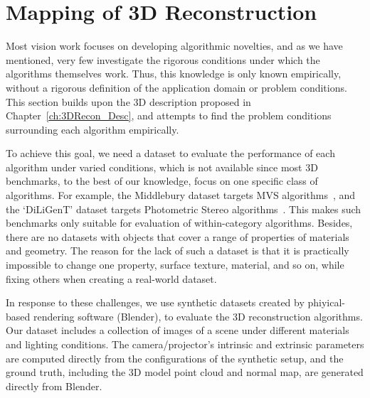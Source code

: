 
\chapter{Mapping of 3D Reconstruction}
\label{ch:3DRecon_Mapping}
Most vision work focuses on developing algorithmic novelties, and as we have mentioned, very few investigate the rigorous conditions under which the algorithms themselves work. Thus, this knowledge is only known empirically, without a rigorous definition of the application domain or problem conditions. This section builds upon the 3D description proposed in Chapter~\ref{ch:3DRecon_Desc}, and attempts to find the problem conditions surrounding each algorithm empirically.

To achieve this goal, we need a dataset to evaluate the performance of each algorithm under varied conditions, which is not available since most 3D benchmarks, to the best of our knowledge, focus on one specific class of algorithms. For example, the Middlebury dataset targets MVS algorithms~\cite{seitz2006comparison}, and the `DiLiGenT' dataset targets Photometric Stereo algorithms~\cite{shi2016benchmark}. This makes such benchmarks only suitable for evaluation of within-category algorithms. Besides, there are no datasets with objects that cover a range of properties of materials and geometry. The reason for the lack of such a dataset is that it is practically impossible to change one property, \eg surface texture, material, and so on, while fixing others when creating a real-world dataset.

In response to these challenges, we use synthetic datasets created by phiyical-based rendering software (Blender), to evaluate the 3D reconstruction algorithms. Our dataset includes a collection of images of a scene under different materials and lighting conditions. The camera/projector's intrinsic and extrinsic parameters are computed directly from the configurations of the synthetic setup, and the ground truth, including the 3D model point cloud and normal map, are generated directly from Blender.

